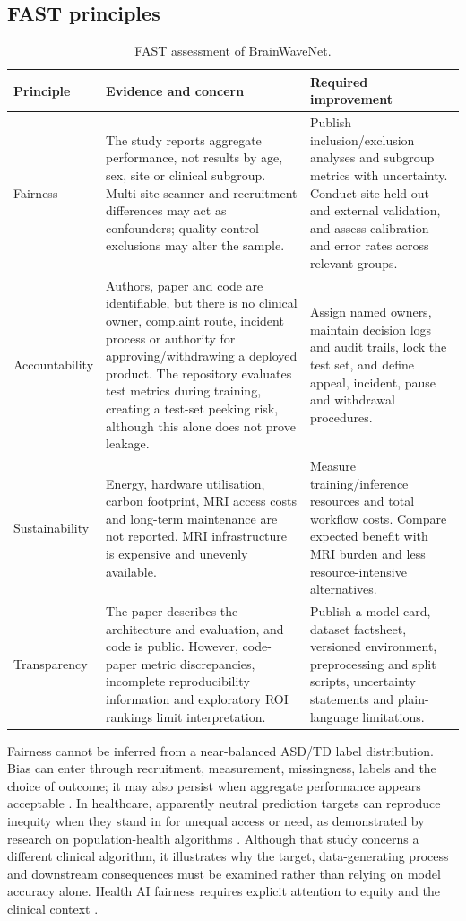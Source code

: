 \documentclass[11pt,a4paper]{article}
\begin{document}
\subsection{FAST principles}
\begin{table}[H]
\centering
\caption{FAST assessment of BrainWaveNet.}
\label{tab:fast}
\small
\begin{tabularx}{\textwidth}{p{2.2cm}Y Y}
\toprule
\textbf{Principle} & \textbf{Evidence and concern} & \textbf{Required improvement}\\
\midrule
Fairness & The study reports aggregate performance, not results by age, sex, site or clinical subgroup. Multi-site scanner and recruitment differences may act as confounders; quality-control exclusions may alter the sample. & Publish inclusion/exclusion analyses and subgroup metrics with uncertainty. Conduct site-held-out and external validation, and assess calibration and error rates across relevant groups.\\
Accountability & Authors, paper and code are identifiable, but there is no clinical owner, complaint route, incident process or authority for approving/withdrawing a deployed product. The repository evaluates test metrics during training, creating a test-set peeking risk, although this alone does not prove leakage. & Assign named owners, maintain decision logs and audit trails, lock the test set, and define appeal, incident, pause and withdrawal procedures.\\
Sustainability & Energy, hardware utilisation, carbon footprint, MRI access costs and long-term maintenance are not reported. MRI infrastructure is expensive and unevenly available. & Measure training/inference resources and total workflow costs. Compare expected benefit with MRI burden and less resource-intensive alternatives.\\
Transparency & The paper describes the architecture and evaluation, and code is public. However, code-paper metric discrepancies, incomplete reproducibility information and exploratory ROI rankings limit interpretation. & Publish a model card, dataset factsheet, versioned environment, preprocessing and split scripts, uncertainty statements and plain-language limitations.\\
\bottomrule
\end{tabularx}
\end{table}

Fairness cannot be inferred from a near-balanced ASD/TD label distribution. Bias can enter through recruitment, measurement, missingness, labels and the choice of outcome; it may also persist when aggregate performance appears acceptable \parencite{mehrabi2021,suresh2021}. In healthcare, apparently neutral prediction targets can reproduce inequity when they stand in for unequal access or need, as demonstrated by research on population-health algorithms \parencite{obermeyer2019}. Although that study concerns a different clinical algorithm, it illustrates why the target, data-generating process and downstream consequences must be examined rather than relying on model accuracy alone. Health AI fairness requires explicit attention to equity and the clinical context \parencite{rajkomar2018}.
\end{document}

